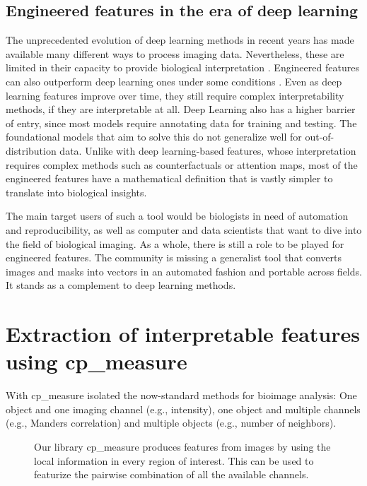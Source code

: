 \documentclass{article}
\begin{document}
\subsection{Engineered features in the era of deep learning}
\label{sec:orgc755c87}
The unprecedented evolution of deep learning methods in recent years has made available many different ways to process imaging data. Nevertheless, these are limited in their capacity to provide biological interpretation \citep{moenDeepLearningCellular2019}. Engineered features can also outperform deep learning ones under some conditions \citep{tangMorphologicalProfilingDrug2024}. Even as deep learning features improve over time, they still require complex interpretability methods, if they are interpretable at all. Deep Learning also has a higher barrier of entry, since most models require annotating data for training and testing. The foundational models that aim to solve this do not generalize well for out-of-distribution data. Unlike with deep learning-based features, whose interpretation requires complex methods such as counterfactuals or attention maps, most of the engineered features have a mathematical definition that is vastly simpler to translate into biological insights.


The main target users of such a tool would be biologists in need of automation and reproducibility, as well as computer and data scientists that want to dive into the field of biological imaging. As a whole, there is still a role to be played for engineered features. The community is missing a generalist tool that converts images and masks into vectors in an automated fashion and portable across fields. It stands as a complement to deep learning methods.
\section{Extraction of interpretable features using cp\_measure}
\label{sec:org8ca3631}
With cp\_measure isolated the now-standard methods for bioimage analysis: One object and one imaging channel (e.g., intensity), one object and multiple channels (e.g., Manders correlation) and multiple objects (e.g., number of neighbors). 

\begin{figure}[htbp]
\centering

\caption{\label{fig:overview}Our library cp\_measure produces features from images by using the local information in every region of interest. This can be used to featurize the pairwise combination of all the available channels.}
\end{figure}
\end{document}
